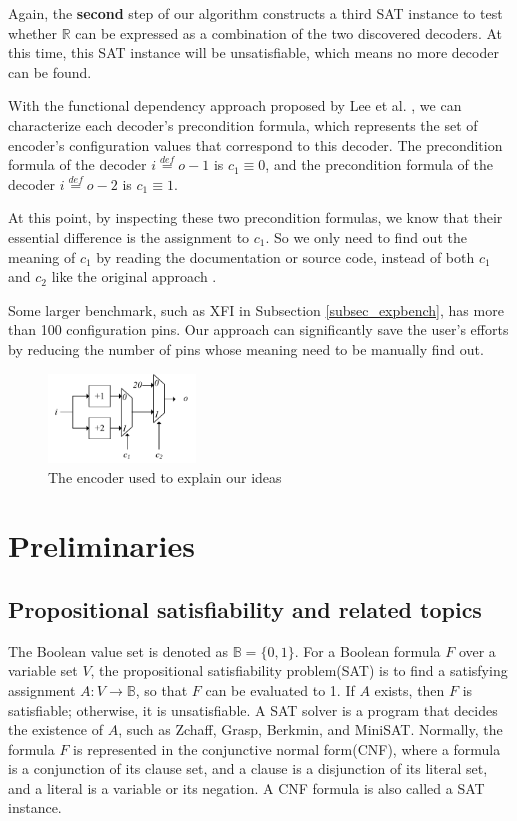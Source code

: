 \documentclass[journal]{IEEEtran}
\begin{document}
Again,
the \textbf{second} step of our algorithm constructs a third SAT instance to test whether $\mathbb{R}$ can be expressed as a combination of the two discovered decoders.
At this time,
this SAT instance will be unsatisfiable,
which means no more decoder can be found.

With the functional dependency approach proposed by Lee et al. \cite{funcdep},
we can characterize each decoder's precondition formula,
which represents the set of encoder's configuration values that correspond to this decoder.
The precondition formula of the decoder $i\stackrel{def}{=}o-1$ is $c_1\equiv 0$,
and the precondition formula of the decoder $i\stackrel{def}{=}o-2$ is $c_1\equiv 1$.

At this point,
by inspecting these two precondition formulas,
we know that their essential difference is the assignment to $c_1$.
So we only need to find out the meaning of $c_1$ by reading the documentation or source code,
instead of both $c_1$ and $c_2$ like the original approach \cite{ShengYuShen:iccad09}.

Some larger benchmark,
such as XFI in Subsection \ref{subsec_expbench},
has more than 100 configuration pins.
Our approach can significantly save the user's efforts by reducing the number of pins whose meaning need to be manually find out.

\begin{figure}[t]
\begin{center}
\includegraphics[width=0.35\textwidth]{multidec}
\end{center}
\caption{The encoder used to explain our ideas}
  \label{multidec}
\end{figure}

\section{Preliminaries}\label{sec_prem}

\subsection{Propositional satisfiability and related topics}\label{subsec_SAT}
The Boolean value set is denoted as $\mathbb{B}=\{0,1\}$.
For a Boolean formula $F$ over a variable set $V$,
the propositional satisfiability problem(SAT) is to find a satisfying assignment $A:V\to \mathbb{B}$,
so that $F$ can be evaluated to 1.
If $A$ exists, then $F$ is satisfiable;
otherwise,
it is unsatisfiable.
A SAT solver is a program that decides the existence of $A$,
such as Zchaff\cite{CHAFF},
Grasp\cite{grasp},
Berkmin\cite{BERKMIN},
and MiniSAT\cite{EXTSAT}.
Normally,
the formula $F$ is represented in the conjunctive normal form(CNF),
where a formula is a conjunction of its clause set,
and a clause is a disjunction of its literal set,
and a literal is a variable or its negation.
A CNF formula is also called a SAT instance.
\end{document}
